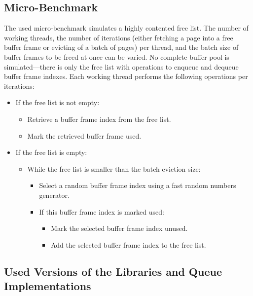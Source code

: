 \subsection[Micro-Benchmark]{Micro-Benchmark} \label{subsec:free-list-micro-benchmark}

	The used micro-benchmark simulates a highly contented free list. The number of working threads, the number of iterations (either fetching a page into a free buffer frame or evicting of a batch of pages) per thread, and the batch size of buffer frames to be freed at once can be varied. No complete buffer pool is simulated---there is only the free list with operations to enqueue and dequeue buffer frame indexes. Each working thread performs the following operations per iterations:
	
\begin{@empty}
	\begin{itemize}
		\itemsep0em
		\item If the free list is not empty:
			\begin{itemize}
				\item Retrieve a buffer frame index from the free list.
				\item Mark the retrieved buffer frame used.
			\end{itemize}
		\item If the free list is empty:
			\begin{itemize}
				\item While the free list is smaller than the batch eviction size:
					\begin{itemize}
						\item Select a random buffer frame index using a fast random numbers generator.
						\item If this buffer frame index is marked used:
							\begin{itemize}
								\item Mark the selected buffer frame index unused.
								\item Add the selected buffer frame index to the free list.
							\end{itemize}
					\end{itemize}
			\end{itemize}
	\end{itemize}
\end{@empty}

\subsection[Queue Versions]{Used Versions of the Libraries and Queue Implementations} \label{subsec:free-list-versions}

